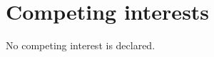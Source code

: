 \documentclass[unnumsec,webpdf,modern,medium]{oup-authoring-template}
\begin{document}
\section{Competing interests}
No competing interest is declared.







\end{document}
